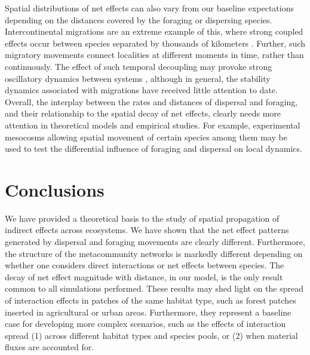 Spatial distributions of net effects can also vary from our baseline expectations depending on the distances covered by the foraging or dispersing species. Intercontinental migrations are an extreme example of this, where strong coupled effects occur between species separated by thousands of kilometers \citep{Alerstam2018}. Further, such migratory movements connect localities at different moments in time, rather than continuously. The effect of such temporal decoupling may provoke strong oscillatory dynamics between systems \citep{Springer2018}, although in general, the stability dynamics associated with migrations have received little attention to date. Overall, the interplay between the rates and distances of dispersal and foraging, and their relationship to the spatial decay of net effects, clearly needs more attention in theoretical models and empirical studies. For example, experimental mesocosms allowing spatial movement of certain species among them may be used to test the differential influence of foraging and dispersal on local dynamics.

\section{Conclusions}

We have provided a theoretical basis to the study of spatial propagation of indirect effects across ecosystems. We have shown that the net effect patterns generated by dispersal and foraging movements are clearly different. Furthermore, the structure of the metacommunity networks is markedly different depending on whether one considers direct interactions or net effects between species. The decay of net effect magnitude with distance, in our model, is the only result common to all simulations performed. These results may shed light on the spread of interaction effects in patches of the same habitat type, such as forest patches inserted in agricultural or urban areas. Furthermore, they represent a baseline case for developing more complex scenarios, such as the effects of interaction spread (1) across different habitat types and species pools, or (2) when material fluxes are accounted for.
